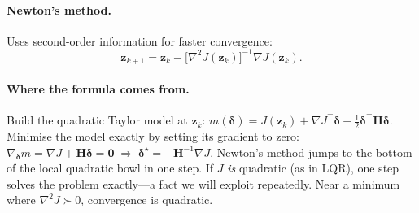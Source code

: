 \documentclass[11pt,twoside]{report}
\theoremstyle{definition}
\theoremstyle{plain}
\theoremstyle{remark}
\newcommand{\0}{\bm{0}}
\begin{document}
\paragraph{Newton's method.}
Uses second-order information for faster convergence:
\begin{equation}\label{eq:newton}
\bm{z}_{k+1}=\bm{z}_{k}-\bigl[\nabla^{2}J(\bm{z}_{k})\bigr]^{-1}\nabla J(\bm{z}_{k}).
\end{equation}

\paragraph{Where the formula comes from.}
Build the quadratic Taylor model at $\bm{z}_{k}$:
$m(\bm{\delta})=J(\bm{z}_{k})+\nabla J^{\!\top}\bm{\delta}
+\tfrac12\bm{\delta}^{\!\top}\bm{H}\bm{\delta}$.
Minimise the model exactly by setting its gradient to zero:
$\nabla_{\bm{\delta}}m=\nabla J+\bm{H}\bm{\delta}=\0
\;\Rightarrow\;\bm{\delta}^{\star}=-\bm{H}^{-1}\nabla J$.
Newton's method jumps to the bottom of the local quadratic bowl in one
step. If $J$ \emph{is} quadratic (as in LQR), one step solves the problem
exactly---a fact we will exploit repeatedly.
Near a minimum where $\nabla^{2}J\succ 0$, convergence is quadratic.
\end{document}
